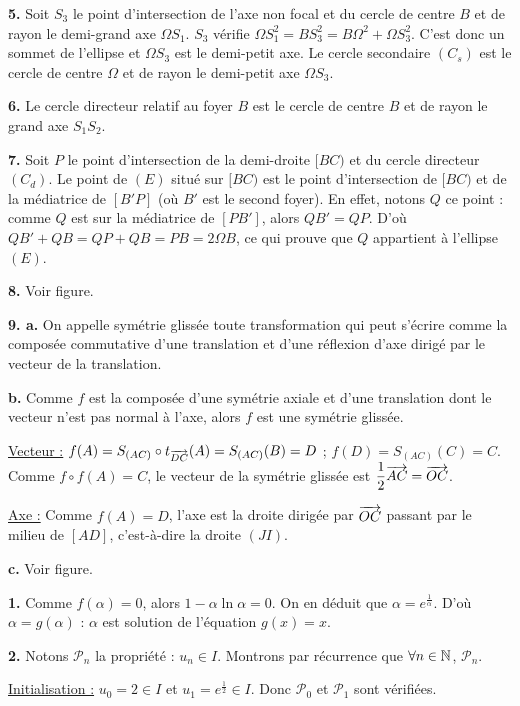 \documentclass[11pt]{article}
\begin{document}
\textbf{5.} Soit $S_3$ le point d'intersection de l'axe non focal et du cercle de centre $B$ et de rayon le demi-grand axe $\Omega S_1$. $S_3$ vérifie $\Omega S_1^2 = BS_3^2 = B\Omega^2 + \Omega S_3^2$. C'est donc un sommet de l'ellipse et $\Omega S_3$ est le demi-petit axe. Le cercle secondaire $(C_s)$ est le cercle de centre $\Omega$ et de rayon le demi-petit axe $\Omega S_3$.

\textbf{6.} Le cercle directeur relatif au foyer $B$ est le cercle de centre $B$ et de rayon le grand axe $S_1 S_2$.

\textbf{7.} Soit $P$ le point d'intersection de la demi-droite $[BC)$ et du cercle directeur $(C_d)$. Le point de $(E)$ situé sur $[BC)$ est le point d'intersection de $[BC)$ et de la médiatrice de $[B'P]$ (où $B'$ est le second foyer). En effet, notons $Q$ ce point : comme $Q$ est sur la médiatrice de $[PB']$, alors $QB' = QP$. D'où $QB' + QB = QP + QB = PB = 2\Omega B$, ce qui prouve que $Q$ appartient à l'ellipse $(E)$.

\textbf{8.} Voir figure.

\textbf{9. a.} On appelle symétrie glissée toute transformation qui peut s'écrire comme la composée commutative d'une translation et d'une réflexion d'axe dirigé par le vecteur de la translation.

\textbf{b.} Comme $f$ est la composée d'une symétrie axiale et d'une translation dont le vecteur n'est pas normal à l'axe, alors $f$ est une symétrie glissée.

\underline{Vecteur :} $f(A) = S_{(AC)} \circ t_{\overrightarrow{DC}}(A) = S_{(AC)}(B) = D$ ; $f(D) = S_{(AC)}(C) = C$. Comme $f \circ f(A) = C$, le vecteur de la symétrie glissée est $\dfrac{1}{2}\overrightarrow{AC} = \overrightarrow{OC}$.

\underline{Axe :} Comme $f(A) = D$, l'axe est la droite dirigée par $\overrightarrow{OC}$ passant par le milieu de $[AD]$, c'est-à-dire la droite $(JI)$.

\textbf{c.} Voir figure.


\textbf{1.} Comme $f(\alpha) = 0$, alors $1 - \alpha\ln\alpha = 0$. On en déduit que $\alpha = e^{\frac{1}{\alpha}}$. D'où $\alpha = g(\alpha)$ : $\alpha$ est solution de l'équation $g(x) = x$.

\textbf{2.} Notons $\mathcal{P}_n$ la propriété : $u_n \in I$. Montrons par récurrence que $\forall n \in \mathbb{N}$, $\mathcal{P}_n$.

\underline{Initialisation :} $u_0 = 2 \in I$ et $u_1 = e^{\frac{1}{2}} \in I$. Donc $\mathcal{P}_0$ et $\mathcal{P}_1$ sont vérifiées.
\end{document}
